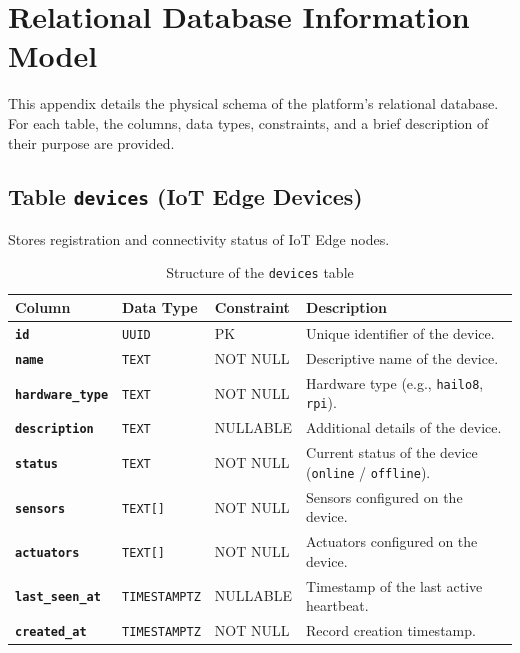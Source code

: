 \chapter{Relational Database Information Model}\label{app:relational_database}

This appendix details the physical schema of the platform's relational database. For each table, the columns, data types, constraints, and a brief description of their purpose are provided.

\section{Table \texttt{devices} (\texorpdfstring{\gls{IoT}}{IoT} Edge Devices)}
Stores registration and connectivity status of \gls{IoT} Edge nodes.

\begin{table}[H]
    \centering
    \caption{Structure of the \texttt{devices} table}
    \label{tab:devices}
    \begin{tabular}{p{}
                    p{}
                    p{}
                    p{}}
        \hline
        \textbf{Column} & \textbf{Data Type} & \textbf{Constraint} & \textbf{Description} \\
        \hline
        \textbf{\texttt{id}} & \texttt{UUID} & \gls{PK} & Unique identifier of the device. \\
        \textbf{\texttt{name}} & \texttt{TEXT} & NOT NULL & Descriptive name of the device. \\
        \textbf{\texttt{hardware\_type}} & \texttt{TEXT} & NOT NULL & Hardware type (e.g., \texttt{hailo8}, \texttt{rpi}). \\
        \textbf{\texttt{description}} & \texttt{TEXT} & NULLABLE & Additional details of the device. \\
        \textbf{\texttt{status}} & \texttt{TEXT} & NOT NULL & Current status of the device (\texttt{online} / \texttt{offline}). \\
        \textbf{\texttt{sensors}} & \texttt{TEXT[]} & NOT NULL & Sensors configured on the device. \\
        \textbf{\texttt{actuators}} & \texttt{TEXT[]} & NOT NULL & Actuators configured on the device. \\
        \textbf{\texttt{last\_seen\_at}} & \texttt{TIMESTAMPTZ} & NULLABLE & Timestamp of the last active heartbeat. \\
        \textbf{\texttt{created\_at}} & \texttt{TIMESTAMPTZ} & NOT NULL & Record creation timestamp. \\
        \hline
    \end{tabular}
\end{table}

